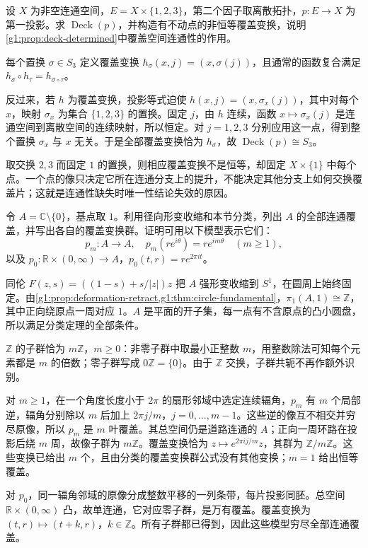 \begin{exercise}\label{g1:ex:disconnected-deck-fixed-point}
	设 \(X\) 为非空连通空间，\(E=X\times\{1,2,3\}\)，第二个因子取离散拓扑，\(p:E\to X\) 为第一投影。求 \(\operatorname{Deck}(p)\)，并构造有不动点的非恒等覆盖变换，说明\cref{g1:prop:deck-determined}中覆盖空间连通性的作用。
\end{exercise}
\begin{solution}
	每个置换 \(\sigma\in S_3\) 定义覆盖变换 \(h_\sigma(x,j)=(x,\sigma(j))\)，且通常的函数复合满足 \(h_\sigma\circ h_\tau=h_{\sigma\circ\tau}\)。

	反过来，若 \(h\) 为覆盖变换，投影等式迫使 \(h(x,j)=(x,\sigma_x(j))\)，其中对每个 \(x\)，映射 \(\sigma_x\) 为集合 \(\{1,2,3\}\) 的置换。固定 \(j\)，由 \(h\) 连续，函数 \(x\mapsto\sigma_x(j)\) 是连通空间到离散空间的连续映射，所以恒定。对 \(j=1,2,3\) 分别应用这一点，得到整个置换 \(\sigma_x\) 与 \(x\) 无关。于是全部覆盖变换恰为 \(h_\sigma\)，故 \(\operatorname{Deck}(p)\cong S_3\)。

	取交换 \(2,3\) 而固定 \(1\) 的置换，则相应覆盖变换不是恒等，却固定 \(X\times\{1\}\) 中每个点。一个点的像只决定它所在连通分支上的提升，不能决定其他分支上如何交换覆盖片；这就是连通性缺失时唯一性结论失效的原因。
\end{solution}

\begin{exercise}\label{g1:ex:annulus-cover-classification}
	令 \(A=\mathbb C\setminus\{0\}\)，基点取 \(1\)。利用径向形变收缩和本节分类，列出 \(A\) 的全部连通覆盖，并写出各自的覆盖变换群。证明可用以下模型表示它们：
	\[
		p_m:A\longrightarrow A,\quad p_m(re^{i\theta})=re^{im\theta}\quad(m\ge1),
	\]
	以及 \(p_0:\mathbb R\times(0,\infty)\to A\)，\(p_0(t,r)=re^{2\pi it}\)。
\end{exercise}
\begin{solution}
	同伦 \(F(z,s)=((1-s)+s/|z|)z\) 把 \(A\) 强形变收缩到 \(S^1\)，在圆周上始终固定。由\cref{g1:prop:deformation-retract,g1:thm:circle-fundamental}，\(\pi_1(A,1)\cong\mathbb Z\)，其中正向绕原点一周对应 \(1\)。\(A\) 是平面的开子集，每一点有不含原点的凸小圆盘，所以满足分类定理的全部条件。

	\(\mathbb Z\) 的子群恰为 \(m\mathbb Z\)，\(m\ge0\)：非零子群中取最小正整数 \(m\)，用整数除法可知每个元素都是 \(m\) 的倍数；零子群写成 \(0\mathbb Z=\{0\}\)。由于 \(\mathbb Z\) 交换，子群共轭不再作额外识别。

	对 \(m\ge1\)，在一个角度长度小于 \(2\pi\) 的扇形邻域中选定连续辐角，\(p_m\) 有 \(m\) 个局部逆，辐角分别除以 \(m\) 后加上 \(2\pi j/m\)，\(j=0,\ldots,m-1\)。这些逆的像互不相交并穷尽原像，所以 \(p_m\) 是 \(m\) 叶覆盖。其总空间仍是道路连通的 \(A\)；正向一周环路在投影后绕 \(m\) 周，故像子群为 \(m\mathbb Z\)。覆盖变换恰为 \(z\mapsto e^{2\pi ij/m}z\)，其群为 \(\mathbb Z/m\mathbb Z\)。这些变换已给出 \(m\) 个，且由分类的覆盖变换群公式没有其他变换；\(m=1\) 给出恒等覆盖。

	对 \(p_0\)，同一辐角邻域的原像分成整数平移的一列条带，每片投影同胚。总空间 \(\mathbb R\times(0,\infty)\) 凸，故单连通，它对应零子群，是万有覆盖。覆盖变换为 \((t,r)\mapsto(t+k,r)\)，\(k\in\mathbb Z\)。所有子群都已得到，因此这些模型穷尽全部连通覆盖。
\end{solution}


